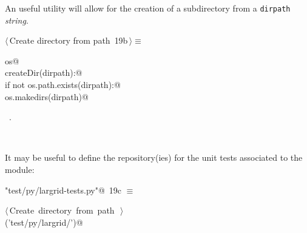 \documentclass[11pt,oneside]{article}	%
\begin{document}
An useful utility will allow for the creation of a subdirectory from a \texttt{dirpath} \emph{string}.
\begin{flushleft} \small
\begin{minipage}{\linewidth} \label{scrap32}
\protect{}$\langle\,$Create directory from path\nobreak\ {\footnotesize 19b}$\,\rangle\equiv$
\vspace{-1ex}
\begin{list}{}{} \item
\mbox{}\verb@import os@\\
\mbox{}\verb@def createDir(dirpath):@\\
\mbox{}\verb@    if not os.path.exists(dirpath):@\\
\mbox{}\verb@        os.makedirs(dirpath)@\\
\mbox{}\verb@@{\NWsep}
\end{list}
\vspace{-1ex}
\footnotesize\addtolength{\baselineskip}{-1ex}
\begin{list}{}{\setlength{\itemsep}{-\parsep}\setlength{\itemindent}{-\leftmargin}}
\item \NWtxtMacroRefIn\ .
\end{list}
\end{minipage}\\[4ex]
\end{flushleft}

It may be useful to define the repository(ies) for the unit tests associated to the module:
\begin{flushleft} \small
\begin{minipage}{\linewidth} \label{scrap33}
\protect{}\verb@"test/py/largrid-tests.py"@\nobreak\ {\footnotesize 19c }$\equiv$
\vspace{-1ex}
\begin{list}{}{} \item
\mbox{}\verb@@\hbox{$\langle\,$Create directory from path\nobreak\ {\footnotesize {}}$\,\rangle$}\verb@@\\
\mbox{}\verb@createDir('test/py/largrid/')@\\
\mbox{}\verb@@{\NWsep}
\end{list}
\vspace{-2ex}
\end{minipage}\\[4ex]
\end{flushleft}
\end{document}

